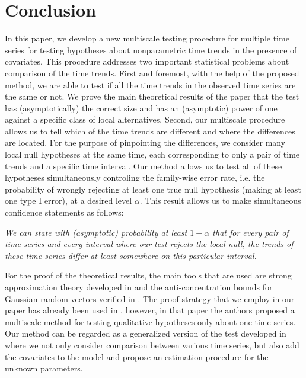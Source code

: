 \documentclass[a4paper,12pt]{article}
\begin{document}
\section{Conclusion}\label{sec:conclusion}

In this paper, we develop a new multiscale testing procedure for multiple time series for testing hypotheses about nonparametric time trends in the presence of covariates. This procedure addresses two important statistical problems about comparison of the time trends. First and foremost, with the help of the proposed method, we are able to test if all the time trends in the observed time series are the same or not. We prove the main theoretical results of the paper that the test has (asymptotically) the correct size and has an (asymptotic) power of one against a specific class of local alternatives. Second, our multiscale procedure allows us to tell which of the time trends are different and where the differences are located. For the purpose of pinpointing the differences, we consider many local null hypotheses at the same time, each corresponding to only a pair of time trends and a specific time interval. Our method allows us to test all of these hypotheses simultaneously controling the family-wise error rate, i.e. the probability of wrongly rejecting at least one true null hypothesis (making at least one type I error), at a desired level $\alpha$. This result allows us to make simultaneous confidence statements as follows: 

\begin{center}
\begin{minipage}[c][1.75cm][c]{14cm}
\textit{We can state with (asymptotic) probability at least $1-\alpha$ that for every pair of time series and every interval where our test rejects the local null, the trends of these time series differ at least somewhere on this particular interval.}
\end{minipage}
\end{center}

For the proof of the theoretical results, the main tools that are used are strong approximation theory developed in \cite{BerkesLiuWu2014} and the anti-concentration bounds for Gaussian random vectors verified in \cite{Chernozhukov2015}. The proof strategy that we employ in our paper has already been used in \cite{KhismatullinaVogt2020}, however, in that paper the authors proposed a multiscale method for testing qualitative hypotheses only about one time series. Our method can be regarded as a generalized version of the test developed in \cite{KhismatullinaVogt2020} where we not only consider comparison between various time series, but also add the covariates to the model and propose an estimation procedure for the unknown parameters.
\end{document}
